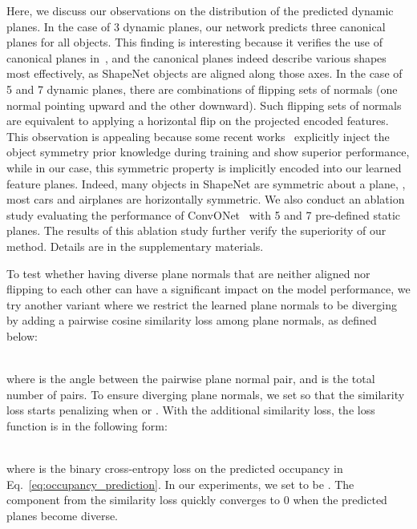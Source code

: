 \documentclass[10pt,twocolumn,letterpaper]{article}
\newcommand{\boldparagraph}[1]{\vspace{0.2cm}\noindent{\bf #1:} }
\begin{document}
\boldparagraph{Observation on plane distribution} 
Here, we discuss our observations on the distribution of the predicted dynamic planes.
In the case of 3 dynamic planes, our network predicts three canonical planes for all objects. 
This finding is interesting because it verifies the use of canonical planes in~\cite{peng2020convolutional}, and the canonical planes indeed describe various shapes most effectively, as ShapeNet objects are aligned along those axes. 
In the case of 5 and 7 dynamic planes, there are combinations of flipping sets of normals (\eg one normal pointing upward and the other downward). Such flipping sets of normals are equivalent to applying a horizontal flip on the projected encoded features. This observation is appealing because some recent works~\cite{wu2020unsupervised,xu2020ladybird} explicitly inject the object symmetry prior knowledge during training and show superior performance, while in our case, this symmetric property is implicitly encoded into our learned feature planes.
Indeed, many objects in ShapeNet are symmetric about a plane, \eg, most cars and airplanes are horizontally symmetric. We also conduct an ablation study evaluating the performance of ConvONet~\cite{peng2020convolutional} with 5 and 7 pre-defined static planes. The results of this ablation study further verify the superiority of our method. Details are in the supplementary materials.


\boldparagraph{Similarity loss} To test whether having diverse plane normals that are neither aligned nor flipping to each other can have a significant impact on the model performance, we try another variant where we restrict the learned plane normals to be diverging by adding a pairwise cosine similarity loss among plane normals, as defined below:

\\
where  is the angle between the pairwise plane normal pair, and  is the total number of pairs. To ensure diverging plane normals, we set  so that the similarity loss starts penalizing when  or . With the additional similarity loss, the loss function is in the following form:

\\
where  is the binary cross-entropy loss on the predicted occupancy in Eq.~\eqref{eq:occupancy_prediction}. In our experiments, we set  to be . The component from the similarity loss quickly converges to 0 when the predicted planes become diverse.
\end{document}
